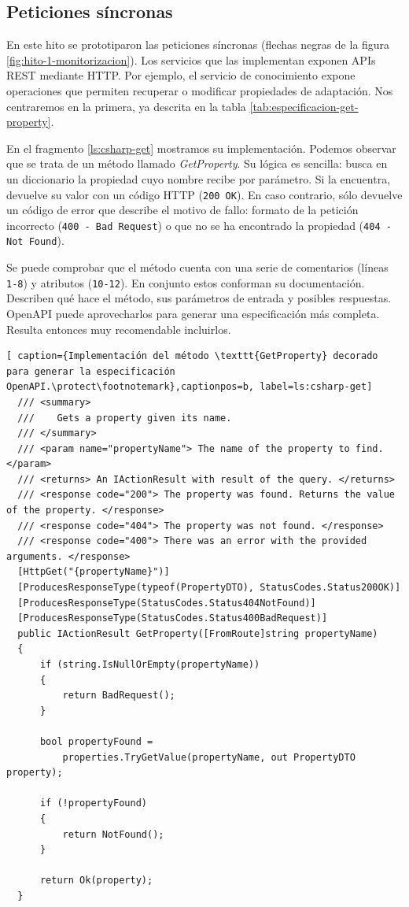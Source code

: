 \subsection{Peticiones síncronas}

En este hito se prototiparon las peticiones síncronas (flechas negras de la figura \ref{fig:hito-1-monitorizacion}). Los servicios que las implementan exponen APIs REST mediante  HTTP. Por ejemplo, el servicio de conocimiento expone operaciones que permiten recuperar o modificar propiedades de adaptación. Nos centraremos en la primera, ya descrita en la tabla \ref{tab:especificacion-get-property}.

En el fragmento \ref{ls:csharp-get} mostramos su implementación. Podemos observar que se trata de un método llamado \emph{GetProperty}. Su lógica es sencilla: busca en un diccionario la propiedad cuyo nombre recibe por parámetro. Si la encuentra, devuelve su valor con un código HTTP (\texttt{200 OK}). En caso contrario, sólo devuelve un código de error que describe el motivo de fallo: formato de la petición incorrecto (\texttt{400 - Bad Request}) o que no se ha encontrado la propiedad (\texttt{404 - Not Found}).

Se puede comprobar que el método cuenta con una serie de comentarios (líneas \texttt{1-8}) y atributos (\texttt{10-12}). En conjunto estos conforman su documentación. Describen qué hace el método, sus parámetros de entrada y posibles respuestas. OpenAPI puede aprovecharlos para generar una especificación más completa. Resulta entonces muy recomendable incluirlos.

\begin{lstlisting}[ caption={Implementación del método \texttt{GetProperty} decorado para generar la especificación OpenAPI.\protect\footnotemark},captionpos=b, label=ls:csharp-get]
  /// <summary>
  ///    Gets a property given its name.
  /// </summary>
  /// <param name="propertyName"> The name of the property to find. </param>
  /// <returns> An IActionResult with result of the query. </returns>
  /// <response code="200"> The property was found. Returns the value of the property. </response>
  /// <response code="404"> The property was not found. </response>
  /// <response code="400"> There was an error with the provided arguments. </response>
  [HttpGet("{propertyName}")]
  [ProducesResponseType(typeof(PropertyDTO), StatusCodes.Status200OK)]
  [ProducesResponseType(StatusCodes.Status404NotFound)]
  [ProducesResponseType(StatusCodes.Status400BadRequest)]
  public IActionResult GetProperty([FromRoute]string propertyName)
  {
      if (string.IsNullOrEmpty(propertyName))
      {
          return BadRequest();
      }

      bool propertyFound =
          properties.TryGetValue(propertyName, out PropertyDTO property);

      if (!propertyFound)
      {
          return NotFound();
      }

      return Ok(property);
  }
\end{lstlisting}

